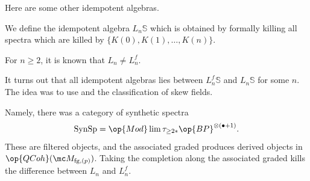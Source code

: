 \documentclass[../notes.tex]{subfiles}
\begin{document}
Here are some other idempotent algebras.
\begin{definition}
	We define the idempotent algebra $L_n\mathbb S$ which is obtained by formally killing all spectra which are killed by $\{K(0),K(1),\ldots,K(n)\}$.
\end{definition}
\begin{remark}
	For $n\ge2$, it is known that $L_n\ne L_n^f$.
\end{remark}
\begin{remark}
	It turns out that all idempotent algebras lies between $L_n^f\mathbb S$ and $L_n\mathbb S$ for some $n$. The idea was to use  and the classification of skew fields.
\end{remark}
\begin{remark}
	Namely, there was a category of synthetic spectra
	\[\mathrm{SynSp}=\op{Mod}\lim\tau_{\ge2*}\op{BP}^{\otimes(\bullet+1)}.\]
	These are filtered objects, and the associated graded produces derived objects in $\op{QCoh}(\mc M_{\mathrm{fg},(p)})$. Taking the completion along the associated graded kills the difference between $L_n$ and $L_n^f$.
\end{remark}
\end{document}

